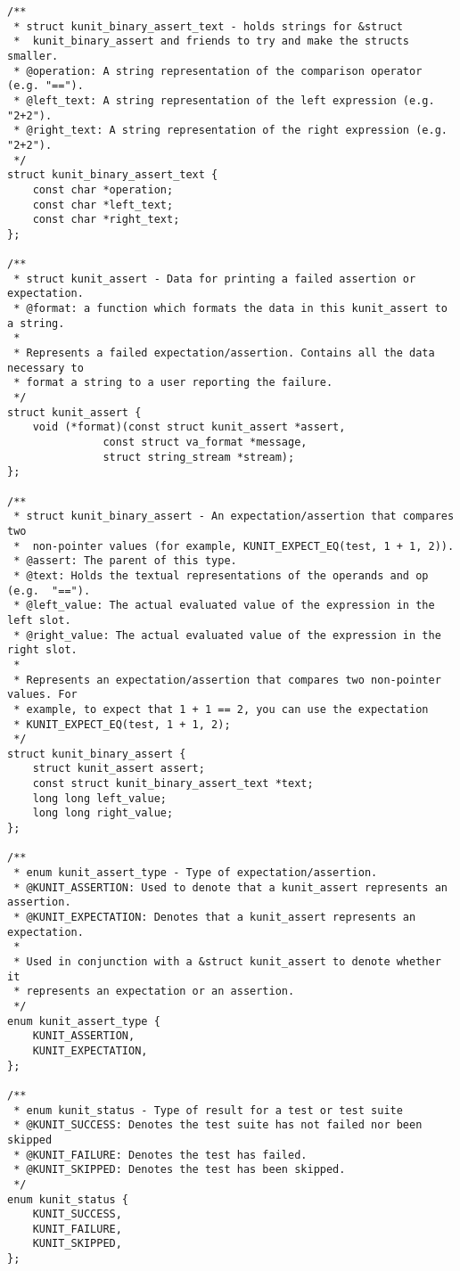 \documentclass{article}
\begin{document}
\begin{lstlisting}[style=CStyle]
/**
 * struct kunit_binary_assert_text - holds strings for &struct
 *	kunit_binary_assert and friends to try and make the structs smaller.
 * @operation: A string representation of the comparison operator (e.g. "==").
 * @left_text: A string representation of the left expression (e.g. "2+2").
 * @right_text: A string representation of the right expression (e.g. "2+2").
 */
struct kunit_binary_assert_text {
	const char *operation;
	const char *left_text;
	const char *right_text;
};

/**
 * struct kunit_assert - Data for printing a failed assertion or expectation.
 * @format: a function which formats the data in this kunit_assert to a string.
 *
 * Represents a failed expectation/assertion. Contains all the data necessary to
 * format a string to a user reporting the failure.
 */
struct kunit_assert {
	void (*format)(const struct kunit_assert *assert,
		       const struct va_format *message,
		       struct string_stream *stream);
};

/**
 * struct kunit_binary_assert - An expectation/assertion that compares two
 *	non-pointer values (for example, KUNIT_EXPECT_EQ(test, 1 + 1, 2)).
 * @assert: The parent of this type.
 * @text: Holds the textual representations of the operands and op (e.g.  "==").
 * @left_value: The actual evaluated value of the expression in the left slot.
 * @right_value: The actual evaluated value of the expression in the right slot.
 *
 * Represents an expectation/assertion that compares two non-pointer values. For
 * example, to expect that 1 + 1 == 2, you can use the expectation
 * KUNIT_EXPECT_EQ(test, 1 + 1, 2);
 */
struct kunit_binary_assert {
	struct kunit_assert assert;
	const struct kunit_binary_assert_text *text;
	long long left_value;
	long long right_value;
};

/**
 * enum kunit_assert_type - Type of expectation/assertion.
 * @KUNIT_ASSERTION: Used to denote that a kunit_assert represents an assertion.
 * @KUNIT_EXPECTATION: Denotes that a kunit_assert represents an expectation.
 *
 * Used in conjunction with a &struct kunit_assert to denote whether it
 * represents an expectation or an assertion.
 */
enum kunit_assert_type {
	KUNIT_ASSERTION,
	KUNIT_EXPECTATION,
};

/**
 * enum kunit_status - Type of result for a test or test suite
 * @KUNIT_SUCCESS: Denotes the test suite has not failed nor been skipped
 * @KUNIT_FAILURE: Denotes the test has failed.
 * @KUNIT_SKIPPED: Denotes the test has been skipped.
 */
enum kunit_status {
	KUNIT_SUCCESS,
	KUNIT_FAILURE,
	KUNIT_SKIPPED,
};


\end{lstlisting}
\end{document}
